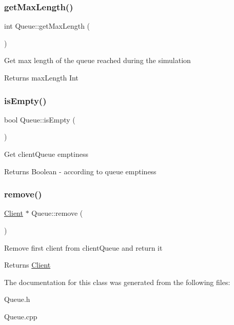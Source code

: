 \subsubsection{\texorpdfstring{get\+Max\+Length()}{getMaxLength()}}
{\footnotesize\ttfamily int Queue\+::get\+Max\+Length (\begin{DoxyParamCaption}{ }\end{DoxyParamCaption})}

Get max length of the queue reached during the simulation \begin{DoxyReturn}{Returns}
max\+Length Int 
\end{DoxyReturn}
\mbox{\label{classQueue_a65d9b23c23c917faa44981539bc34be7}} 
\subsubsection{\texorpdfstring{is\+Empty()}{isEmpty()}}
{\footnotesize\ttfamily bool Queue\+::is\+Empty (\begin{DoxyParamCaption}{ }\end{DoxyParamCaption})}

Get client\+Queue emptiness \begin{DoxyReturn}{Returns}
Boolean -\/ according to queue emptiness 
\end{DoxyReturn}
\mbox{\label{classQueue_a2767e32f2c7f51eedf0b75af9d944f67}} 
\subsubsection{\texorpdfstring{remove()}{remove()}}
{\footnotesize\ttfamily \hyperlink{classClient}{Client} $\ast$ Queue\+::remove (\begin{DoxyParamCaption}{ }\end{DoxyParamCaption})}

Remove first client from client\+Queue and return it \begin{DoxyReturn}{Returns}
\hyperlink{classClient}{Client} 
\end{DoxyReturn}


The documentation for this class was generated from the following files\+:\begin{DoxyCompactItemize}
\item 
Queue.\+h\item 
Queue.\+cpp\end{DoxyCompactItemize}

